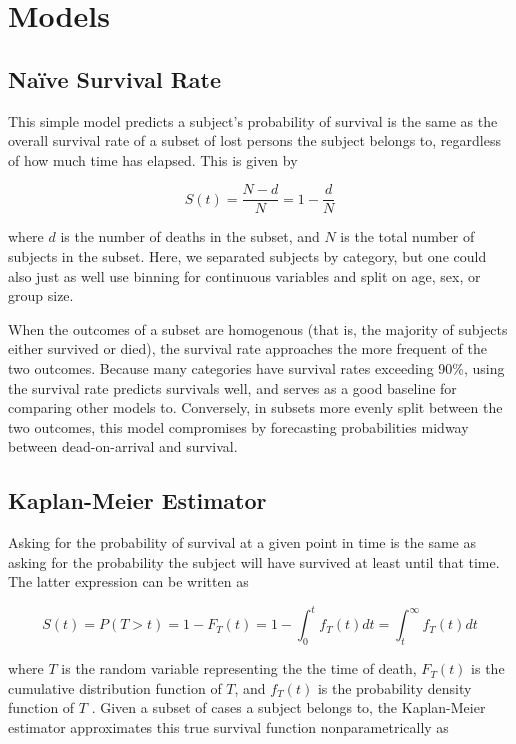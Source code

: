 \documentclass[12pt,titlepage]{article}
\begin{document}
  \section{Models}
    \subsection{Na{\"i}ve Survival Rate}
      This simple model predicts a subject's probability of survival is the
      same as the overall survival rate of a subset of lost persons the subject
      belongs to, regardless of how much time has elapsed. This is given by

      $$S(t) = \frac{N - d}{N} = 1 - \frac{d}{N}$$

      where $d$ is the number of deaths in the subset, and $N$ is the total
      number of subjects in the subset. Here, we separated subjects by
      category, but one could also just as well use binning for continuous
      variables and split on age, sex, or group size.

      When the outcomes of a subset are homogenous (that is, the majority of
      subjects either survived or died), the survival rate approaches the
      more frequent of the two outcomes. Because many categories have
      survival rates exceeding 90\%, using the survival rate predicts
      survivals well, and serves as a good baseline for comparing other
      models to. Conversely, in subsets more evenly split between the two
      outcomes, this model compromises by forecasting probabilities midway
      between dead-on-arrival and survival.

    \subsection{Kaplan-Meier Estimator}
      Asking for the probability of survival at a given point in time is the
      same as asking for the probability the subject will have survived at
      least until that time. The latter expression can be written as

      $$S(t) = P(T > t) = 1 - F_T(t) = 1 - \int_0^t f_T(t) dt = \int_t^\infty f_T(t) dt$$

      where $T$ is the random variable representing the the time of death,
      $F_T(t)$ is the cumulative distribution function of $T$, and $f_T(t)$
      is the probability density function of $T$ \cite{rochford}. Given a
      subset of cases a subject belongs to, the Kaplan-Meier estimator
      approximates this true survival function nonparametrically as
\end{document}
